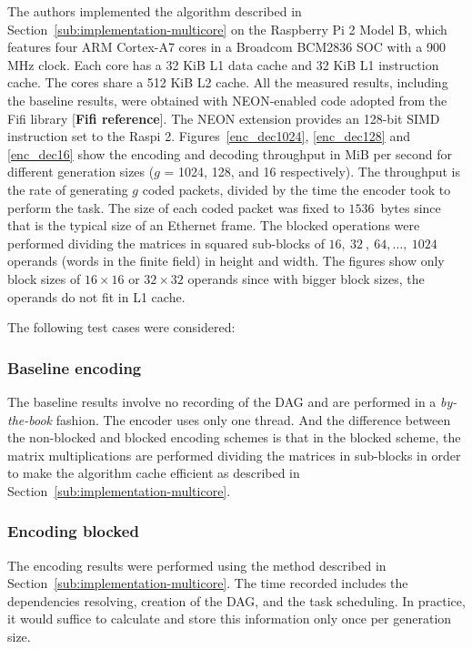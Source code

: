The authors implemented the algorithm described in
Section~\ref{sub:implementation-multicore} on the Raspberry Pi 2 Model B,
which features four ARM Cortex-A7 cores in a Broadcom BCM2836 \ac{SOC}
with a 900 MHz clock. Each core has a 32 KiB L1 data cache and 32 KiB
L1 instruction cache. The cores share a 512 KiB L2 cache. All the
measured results, including the baseline results, were obtained with
NEON-enabled code adopted from the Fifi library [\textbf{Fifi reference}].
The NEON extension provides an 128-bit \ac{SIMD} instruction set to the
\ac{Raspi} 2. Figures~\ref{enc_dec1024}, \ref{enc_dec128} and
\ref{enc_dec16} show the encoding and decoding throughput in MiB per
second for different generation sizes ($g$ = 1024, 128, and 16
respectively). The throughput is the rate of generating $g$ coded packets,
divided by the time the encoder took to perform the task. The size of
each coded packet was fixed to $1536$~bytes since that is the typical
size of an Ethernet frame. The blocked operations were performed dividing
the matrices in squared sub-blocks of $16,\ 32\ ,\ 64,\ldots,\ 1024$ operands
(words in the finite field) in height and width. The figures show only
block sizes of $16 \times 16$ or $32 \times 32$ operands since with bigger
block sizes, the operands do not fit in L1 cache.

The following test cases were considered:

\subsubsection{Baseline encoding}
The baseline results involve no recording of the
\ac{DAG} and are performed in a \emph{by-the-book} fashion. The encoder uses
only one thread. And the difference between the non-blocked and blocked
encoding schemes is that in the blocked scheme, the matrix multiplications are
performed dividing the matrices in sub-blocks in order to make the algorithm
cache efficient as described in Section~\ref{sub:implementation-multicore}.

\subsubsection{Encoding blocked}
The encoding results were performed using the
method described in Section~\ref{sub:implementation-multicore}. The time
recorded includes the dependencies resolving, creation of the \ac{DAG},
and the task scheduling. In practice, it would suffice to calculate and
store this information only once per generation size.

